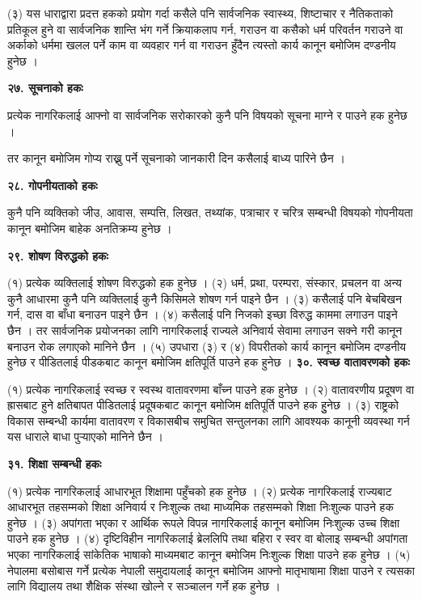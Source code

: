 (३) यस धाराद्वारा प्रदत्त हकको प्रयोग गर्दा कसैले पनि सार्वजनिक स्वास्थ्य, शिष्टाचार र नैतिकताको प्रतिकूल हुने वा सार्वजनिक शान्ति भंग गर्ने क्रियाकलाप गर्न, गराउन वा कसैको धर्म परिवर्तन गराउने वा अर्काको धर्ममा खलल पर्ने काम वा व्यवहार गर्न वा गराउन हुँदैन त्यस्तो कार्य कानून बमोजिम दण्डनीय हुनेछ ।

\textbf{२७. सूचनाको हकः}

प्रत्येक नागरिकलाई आफ्नो वा सार्वजनिक सरोकारको कुनै पनि विषयको सूचना माग्ने र पाउने हक हुनेछ ।

तर कानून बमोजिम गोप्य राख्नु पर्ने सूचनाको जानकारी दिन कसैलाई बाध्य पारिने छैन ।

\textbf{२८. गोपनीयताको हकः}

कुनै पनि व्यक्तिको जीउ, आवास, सम्पत्ति, लिखत, तथ्यांक, पत्राचार र चरित्र सम्बन्धी विषयको गोपनीयता कानून बमोजिम बाहेक अनतिक्रम्य हुनेछ ।

\textbf{२९. शोषण विरुद्धको हकः}

(१) प्रत्येक व्यक्तिलाई शोषण विरुद्धको हक हुनेछ ।
(२) धर्म, प्रथा, परम्परा, संस्कार, प्रचलन वा अन्य कुनै आधारमा कुनै पनि व्यक्तिलाई कुनै किसिमले शोषण गर्न पाइने छैन ।
(३) कसैलाई पनि बेचबिखन गर्न, दास वा बाँधा बनाउन पाइने छैन ।
(४) कसैलाई पनि निजको इच्छा विरुद्ध काममा लगाउन पाइने छैन । तर सार्वजनिक प्रयोजनका लागि नागरिकलाई राज्यले अनिवार्य
सेवामा लगाउन सक्ने गरी कानून बनाउन रोक लगाएको मानिने छैन ।
(५) उपधारा (३) र (४) विपरीतको कार्य कानून बमोजिम दण्डनीय हुनेछ र पीडितलाई पीडकबाट कानून बमोजिम क्षतिपूर्ति पाउने हक हुनेछ ।
\textbf{३०. स्वच्छ वातावरणको हकः}

(१) प्रत्येक नागरिकलाई स्वच्छ र स्वस्थ वातावरणमा बाँच्न पाउने हक हुनेछ ।
(२) वातावरणीय प्रदूषण वा ह्रासबाट हुने क्षतिबापत पीडितलाई प्रदूषकबाट कानून बमोजिम क्षतिपूर्ति पाउने हक हुुनेछ ।
(३) राष्ट्रको विकास सम्बन्धी कार्यमा वातावरण र विकासबीच समुचित सन्तुलनका लागि आवश्यक कानूनी व्यवस्था गर्न यस धाराले बाधा
पुर्‍याएको मानिने छैन ।

\textbf{३१. शिक्षा सम्बन्धी हकः}

(१) प्रत्येक नागरिकलाई आधारभूत शिक्षामा पहुँचको हक हुनेछ ।
(२) प्रत्येक नागरिकलाई राज्यबाट आधारभूत तहसम्मको शिक्षा अनिवार्य र निःशुल्क तथा माध्यमिक तहसम्मको शिक्षा निःशुल्क पाउने हक हुनेछ ।
(३) अपांगता भएका र आर्थिक रूपले विपन्न नागरिकलाई कानून बमोजिम निःशुल्क उच्च शिक्षा पाउने हक हुनेछ ।
(४) दृष्टिविहीन नागरिकलाई ब्रेललिपि तथा बहिरा र स्वर वा बोलाइ सम्बन्धी अपांगता भएका नागरिकलाई सांकेतिक भाषाको माध्यमबाट कानून बमोजिम निःशुल्क शिक्षा पाउने हक हुनेछ ।
(५) नेपालमा बसोबास गर्ने प्रत्येक नेपाली समुदायलाई कानून बमोजिम आफ्नो मातृभाषामा शिक्षा पाउने र त्यसका लागि विद्यालय तथा
शैक्षिक संस्था खोल्ने र सञ्चालन गर्ने हक हुनेछ ।

